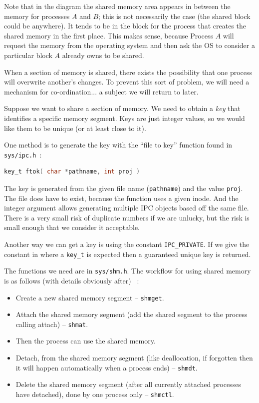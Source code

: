 \documentclass[a4paper]{report}
\begin{document}
Note that in the diagram the shared memory area appears in between the memory for processes $A$ and $B$; this is not necessarily the case (the shared block could be anywhere). It tends to be in the block for the process that creates the shared memory in the first place. This makes sense, because Process $A$ will request the memory from the operating system and then ask the OS to consider a particular block $A$ already owns to be shared.

When a section of memory is shared, there exists the possibility that one process will overwrite another's changes. To prevent this sort of problem, we will need a mechanism for co-ordination... a subject we will return to later.

Suppose we want to share a section of memory. We need to obtain a \textit{key} that identifies a specific memory segment. Keys are just integer values, so we would like them to be unique (or at least close to it).

One method is to generate the key with the ``file to key'' function found in \texttt{sys/ipc.h}~\cite{lpi}:
\begin{lstlisting}[language=C]
key_t ftok( char *pathname, int proj )
\end{lstlisting}

The key is generated from the given file name (\texttt{pathname}) and the value \texttt{proj}. The file does have to exist, because the function uses a given inode. And the integer argument allows generating multiple IPC objects based off the same file. There is a very small risk of duplicate numbers if we are unlucky, but the risk is small enough that we consider it acceptable.

Another way we can get a key is using the constant \texttt{IPC\_PRIVATE}. If we give the constant in where a \texttt{key\_t} is expected then a guaranteed unique key is returned.

The functions we need are in \texttt{sys/shm.h}. The workflow for using shared memory is as follows (with details obviously after) ~\cite{lpi}:
\begin{itemize}
	\item Create a new shared memory segment -- \texttt{shmget}.
	\item Attach the shared memory segment (add the shared segment to the process calling attach) -- \texttt{shmat}.
	\item Then the process can use the shared memory.
	\item Detach, from the shared memory segment (like deallocation, if forgotten then it will happen automatically when a process ends) -- \texttt{shmdt}.
	\item Delete the shared memory segment (after all currently attached processes have detached), done by one process only -- \texttt{shmctl}.
\end{itemize}
\end{document}
